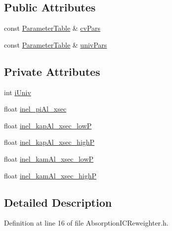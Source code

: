 \subsection*{Public Attributes}
\begin{DoxyCompactItemize}
\item 
const \hyperlink{class_neutrino_flux_reweight_1_1_parameter_table}{Parameter\-Table} \& \hyperlink{class_neutrino_flux_reweight_1_1_absorption_i_c_reweighter_a48bef225244e591385f084f20ce4c267}{cv\-Pars}
\item 
const \hyperlink{class_neutrino_flux_reweight_1_1_parameter_table}{Parameter\-Table} \& \hyperlink{class_neutrino_flux_reweight_1_1_absorption_i_c_reweighter_a76db51ee33303841ac96b51a71d9e193}{univ\-Pars}
\end{DoxyCompactItemize}
\subsection*{Private Attributes}
\begin{DoxyCompactItemize}
\item 
int \hyperlink{class_neutrino_flux_reweight_1_1_absorption_i_c_reweighter_a634755f48664f8b84b036b068a543ac5}{i\-Univ}
\item 
float \hyperlink{class_neutrino_flux_reweight_1_1_absorption_i_c_reweighter_a9eb43d6dc37d7d56c5fc63ef04ae0b95}{inel\-\_\-pi\-Al\-\_\-xsec}
\item 
float \hyperlink{class_neutrino_flux_reweight_1_1_absorption_i_c_reweighter_ada87b802b0f5a66ffbdae8557c677857}{inel\-\_\-kap\-Al\-\_\-xsec\-\_\-low\-P}
\item 
float \hyperlink{class_neutrino_flux_reweight_1_1_absorption_i_c_reweighter_a14274987e004a55f88767d9ec22d7c9d}{inel\-\_\-kap\-Al\-\_\-xsec\-\_\-high\-P}
\item 
float \hyperlink{class_neutrino_flux_reweight_1_1_absorption_i_c_reweighter_a0b3707268a0569123e3d7116d35d63d6}{inel\-\_\-kam\-Al\-\_\-xsec\-\_\-low\-P}
\item 
float \hyperlink{class_neutrino_flux_reweight_1_1_absorption_i_c_reweighter_a216cbaf9abd19f100ed5444b7a11011d}{inel\-\_\-kam\-Al\-\_\-xsec\-\_\-high\-P}
\end{DoxyCompactItemize}


\subsection{Detailed Description}


Definition at line 16 of file Absorption\-I\-C\-Reweighter.\-h.



